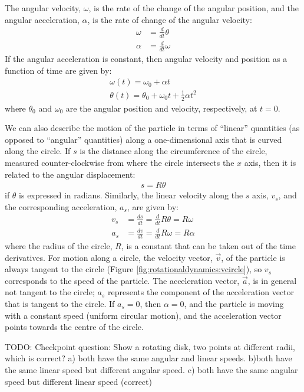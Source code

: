 The angular velocity, $\omega$, is the rate of the change of the angular position, and the angular acceleration, $\alpha$, is the rate of change of the angular velocity:
\begin{align*}
\omega &= \frac{d}{dt}\theta \\
\alpha &= \frac{d}{dt}\omega
\end{align*}
If the angular acceleration is constant, then angular velocity and position as a function of time are given by:
\begin{align*}
\omega(t) = \omega_0+\alpha t\\
\theta(t) = \theta_0+\omega_0 t+\frac{1}{2}\alpha t^2
\end{align*}
where $\theta_0$ and $\omega_0$ are the angular position and velocity, respectively, at $t=0$.

We can also describe the motion of the particle in terms of ``linear'' quantities (as opposed to ``angular'' quantities) along a one-dimensional axis that is curved along the circle. If $s$ is the distance along the circumference of the circle, measured counter-clockwise from where the circle intersects the $x$ axis, then it is related to the angular displacement:
\begin{align*}
s = R\theta
\end{align*}
if $\theta$ is expressed in radians. Similarly, the linear velocity along the $s$ axis, $v_s$, and the corresponding acceleration, $a_s$, are given by:
\begin{align*}
v_s &= \frac{ds}{dt} =\frac{d}{dt}R\theta = R\omega\\
a_s&= \frac{dv}{dt} =\frac{d}{dt}R\omega = R\alpha
\end{align*}
where the radius of the circle, $R$, is a constant that can be taken out of the time derivatives. For motion along a circle, the velocity vector, $\vec v$, of the particle is always tangent to the circle (Figure \ref{fig:rotationaldynamics:vcircle}), so $v_s$ corresponds to the speed of the particle. The acceleration vector, $\vec a$, is in general not tangent to the circle; $a_s$ represents the component of the acceleration vector that is tangent to the circle. If $a_s=0$, then $\alpha=0$, and the particle is moving with a constant speed (uniform circular motion), and the acceleration vector points towards the centre of the circle.

TODO: Checkpoint question: Show a rotating disk, two points at different radii, which is correct? a) both have the same angular and linear speeds. b)both have the same linear speed but different angular speed. c) both have the same angular speed but different linear speed (correct)


